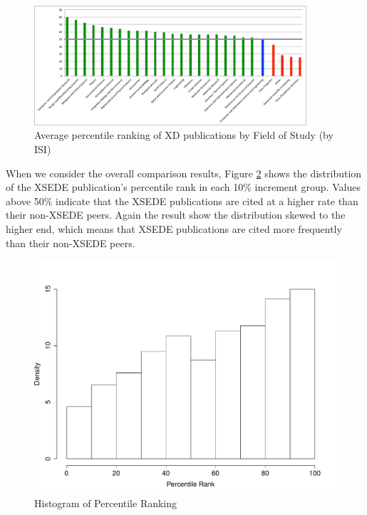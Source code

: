 \documentclass{sig-alternate}
\begin{document}
\begin{figure}[htb!]
  \centering
    \includegraphics[width=0.9\textwidth]{images/isi_peers_fos.pdf}
    \caption{Average percentile ranking of XD publications by Field of Study (by ISI)}
    \label{F:isi_peers_fos}
\end{figure}

When we consider the overall comparison results, Figure
\ref{F:ptranking_hist} shows the distribution of the XSEDE
publication's percentile rank in each 10\% increment group. Values
above 50\% indicate that the XSEDE publications are cited at a higher
rate than their non-XSEDE peers.  Again the result show the
distribution skewed to the higher end, which means that XSEDE
publications are cited more frequently than their non-XSEDE peers.

\begin{figure}[htb!]
    \includegraphics[width=0.95\columnwidth]{images/ptranking_histogram.pdf}
    \caption{Histogram of Percentile Ranking}
    \label{F:ptranking_hist}
\end{figure}
\end{document}
